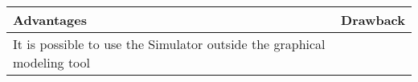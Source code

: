 \begin{tabular}{|p{}||p{}|}
\hline
  \textbf{Advantages}&\textbf{Drawback}\\
\hline
It is possible to use the Simulator outside the graphical modeling tool & \\
\hline
\end{tabular}








